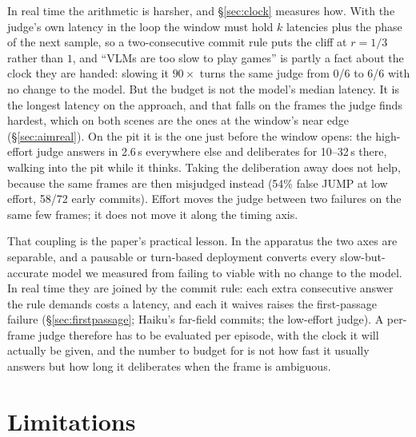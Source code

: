 \documentclass[11pt]{article}
\begin{document}
In real time the arithmetic is harsher, and \S\ref{sec:clock} measures how.
With the judge's own latency in the loop the window must hold $k$ latencies
plus the phase of the next sample, so a two-consecutive commit rule puts the
cliff at $r = 1/3$ rather than $1$, and ``VLMs are too slow to play games''
is partly a fact about the clock they are handed: slowing it $90\times$ turns
the same judge from 0/6 to 6/6 with no change to the model. But the budget
is not the model's median latency. It is the longest latency on the
approach, and that falls on the frames the judge finds hardest, which on
both scenes are the ones at the window's near edge
(\S\ref{sec:aimreal}). On the pit it is the one just before the window
opens: the high-effort judge answers in 2.6\,s
everywhere else and deliberates for 10--32\,s there, walking into the pit
while it thinks. Taking the deliberation away does not help, because the
same frames are then misjudged instead (54\% false JUMP at low effort, 58/72
early commits). Effort moves the judge between two failures on the same few
frames; it does not move it along the timing axis.

That coupling is the paper's practical lesson. In the apparatus the two
axes are separable, and a pausable or turn-based deployment converts every
slow-but-accurate model we measured from failing to viable with no change
to the model. In real time they are joined by the commit rule: each extra
consecutive answer the rule demands costs a latency, and each it waives
raises the first-passage failure (\S\ref{sec:firstpassage}; Haiku's
far-field commits; the low-effort judge). A per-frame judge therefore has to
be evaluated per episode, with the clock it will actually be given, and the
number to budget for is not how fast it usually answers but how long it
deliberates when the frame is ambiguous.

\section{Limitations}
\end{document}
